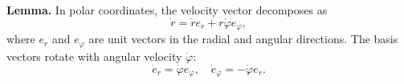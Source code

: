 \textbf{Lemma.} In polar coordinates, the velocity vector decomposes as
$$\dot{r} = \dot{r} e_r + r \dot{\varphi} e_\varphi,$$
where $e_r$ and $e_\varphi$ are unit vectors in the radial and angular directions. The basis vectors rotate with angular velocity $\dot{\varphi}$:
$$\dot{e}_r = \dot{\varphi} e_\varphi, \quad \dot{e}_\varphi = -\dot{\varphi} e_r.$$
